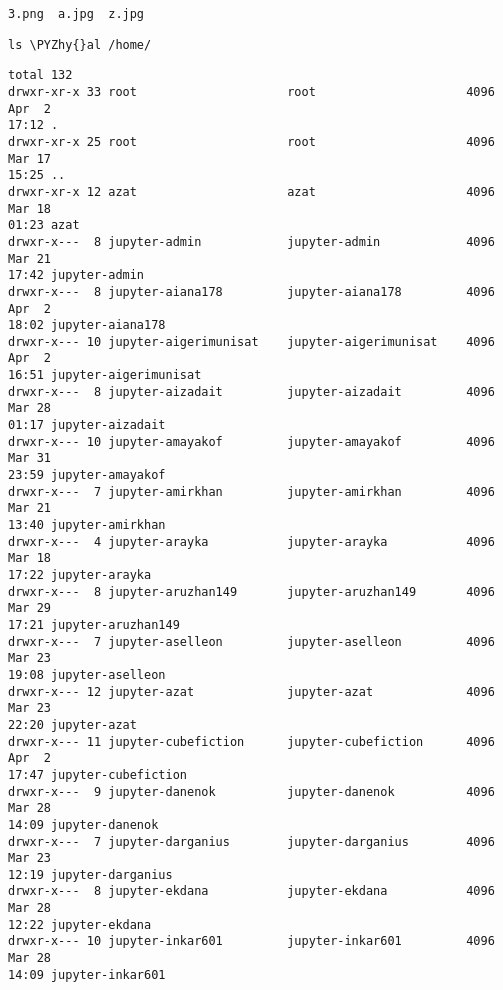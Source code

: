 \documentclass[11pt]{article}
\makeatletter
\def\PYZhy{\char`\-}
\newcommand{\boxspacing}{\kern\kvtcb@left@rule\kern\kvtcb@boxsep}
\newcommand{\prompt}[4]{
        \ttfamily\llap{{\color{#2}[#3]:\hspace{3pt}#4}}\vspace{-\baselineskip}
    }
\makeatother
\begin{document}
    \begin{Verbatim}[commandchars=\\\{\}]
3.png  a.jpg  z.jpg
    \end{Verbatim}

    \begin{tcolorbox}[breakable, size=fbox, boxrule=1pt, pad at break*=1mm,colback=cellbackground, colframe=cellborder]
\prompt{In}{incolor}{66}{\boxspacing}
\begin{Verbatim}[commandchars=\\\{\}]
ls \PYZhy{}al /home/
\end{Verbatim}
\end{tcolorbox}

    \begin{Verbatim}[commandchars=\\\{\}]
total 132
drwxr-xr-x 33 root                     root                     4096 Apr  2
17:12 .
drwxr-xr-x 25 root                     root                     4096 Mar 17
15:25 ..
drwxr-xr-x 12 azat                     azat                     4096 Mar 18
01:23 azat
drwxr-x---  8 jupyter-admin            jupyter-admin            4096 Mar 21
17:42 jupyter-admin
drwxr-x---  8 jupyter-aiana178         jupyter-aiana178         4096 Apr  2
18:02 jupyter-aiana178
drwxr-x--- 10 jupyter-aigerimunisat    jupyter-aigerimunisat    4096 Apr  2
16:51 jupyter-aigerimunisat
drwxr-x---  8 jupyter-aizadait         jupyter-aizadait         4096 Mar 28
01:17 jupyter-aizadait
drwxr-x--- 10 jupyter-amayakof         jupyter-amayakof         4096 Mar 31
23:59 jupyter-amayakof
drwxr-x---  7 jupyter-amirkhan         jupyter-amirkhan         4096 Mar 21
13:40 jupyter-amirkhan
drwxr-x---  4 jupyter-arayka           jupyter-arayka           4096 Mar 18
17:22 jupyter-arayka
drwxr-x---  8 jupyter-aruzhan149       jupyter-aruzhan149       4096 Mar 29
17:21 jupyter-aruzhan149
drwxr-x---  7 jupyter-aselleon         jupyter-aselleon         4096 Mar 23
19:08 jupyter-aselleon
drwxr-x--- 12 jupyter-azat             jupyter-azat             4096 Mar 23
22:20 jupyter-azat
drwxr-x--- 11 jupyter-cubefiction      jupyter-cubefiction      4096 Apr  2
17:47 jupyter-cubefiction
drwxr-x---  9 jupyter-danenok          jupyter-danenok          4096 Mar 28
14:09 jupyter-danenok
drwxr-x---  7 jupyter-darganius        jupyter-darganius        4096 Mar 23
12:19 jupyter-darganius
drwxr-x---  8 jupyter-ekdana           jupyter-ekdana           4096 Mar 28
12:22 jupyter-ekdana
drwxr-x--- 10 jupyter-inkar601         jupyter-inkar601         4096 Mar 28
14:09 jupyter-inkar601

\end{Verbatim}
\end{document}
